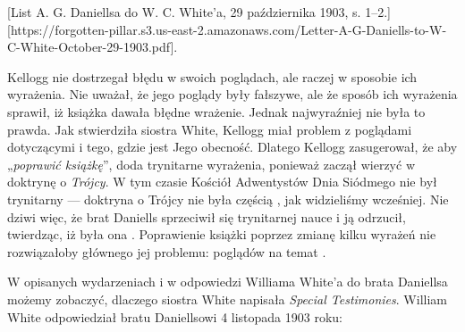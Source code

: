 
[List A. G. Daniellsa do W. C. White'a, 29 października 1903, s. 1--2.][https://forgotten-pillar.s3.us-east-2.amazonaws.com/Letter-A-G-Daniells-to-W-C-White-October-29-1903.pdf].

Kellogg nie dostrzegał błędu w swoich poglądach, ale raczej w sposobie ich wyrażenia. Nie uważał, że jego poglądy były fałszywe, ale że sposób ich wyrażenia sprawił, iż książka dawała błędne wrażenie. Jednak najwyraźniej nie była to prawda. Jak stwierdziła siostra White, Kellogg miał problem z poglądami dotyczącymi  i tego, gdzie jest Jego obecność. Dlatego Kellogg zasugerował, że aby „\textit{poprawić książkę}”, doda trynitarne wyrażenia, ponieważ zaczął wierzyć w doktrynę o \textit{Trójcy}. W tym czasie Kościół Adwentystów Dnia Siódmego nie był trynitarny — doktryna o Trójcy nie była częścią , jak widzieliśmy wcześniej. Nie dziwi więc, że brat Daniells sprzeciwił się trynitarnej nauce i ją odrzucił, twierdząc, iż była ona . Poprawienie książki poprzez zmianę kilku wyrażeń nie rozwiązałoby głównego jej problemu: poglądów na temat .

W opisanych wydarzeniach i w odpowiedzi Williama White'a do brata Daniellsa możemy zobaczyć, dlaczego siostra White napisała \textit{Special Testimonies}. William White odpowiedział bratu Daniellsowi 4 listopada 1903 roku:




